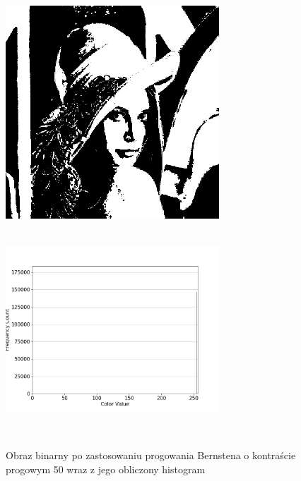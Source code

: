 \documentclass[a4paper,12pt]{book}
\begin{document}
\begin{figure}[H]
	\caption{Obraz binarny po zastosowaniu progowania Bernstena o kontraście progowym 50 wraz z jego obliczony histogram}
	\includegraphics[width=8cm, height=8cm]{5-4/local-threshold-image-lena-50.png}
	\includegraphics[width=8cm, height=8cm]{5-4/local-threshold-lena-50.png}
\end{figure}
\end{document}
